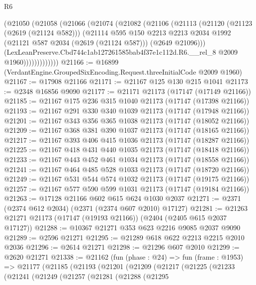 \begin{lexlean}{R6}
\begin{coremodule}
              (@21050
                (@21058
                  (@21066
                    (@21074
                      (@21082
                        (@21106
                          (@21113
                            (@21120
                              (@21123 (@2619 (@21124 @582)))
                              (@21114
                                @595
                                @150
                                @2213
                                @2213
                                @2034
                                @1992
                                (@21121 @587 @2034 (@2619 (@21124 @587)))
                                (@2649 @21096)))
                            (LexLeanPreserve.Cbd744c1ab127261585bab4f37e1c112d.R6.__rel_8
                              @2009
                              @1960)))))))))))))
@21166 := @16899 (VerdantEngine.GroupedSixEncoding.Request.threeInitialCode @2009 @1960)
@21167 := @17908 @21166
@21171 := @21167 @125 @130 @215 @1041
@21173 := @2348 @16856 @9090
@21177 := @21171 @21173 (@17147 (@17149 @21166))
@21185 := @21167 @175 @236 @315 @1040 @21173 (@17147 (@17398 @21166))
@21193 := @21167 @291 @330 @340 @1039 @21173 (@17147 (@17948 @21166))
@21201 := @21167 @343 @356 @365 @1038 @21173 (@17147 (@18052 @21166))
@21209 := @21167 @368 @381 @390 @1037 @21173 (@17147 (@18165 @21166))
@21217 := @21167 @393 @406 @415 @1036 @21173 (@17147 (@18287 @21166))
@21225 := @21167 @418 @431 @440 @1035 @21173 (@17147 (@18418 @21166))
@21233 := @21167 @443 @452 @461 @1034 @21173 (@17147 (@18558 @21166))
@21241 := @21167 @464 @485 @528 @1033 @21173 (@17147 (@18720 @21166))
@21249 := @21167 @531 @544 @574 @1032 @21173 (@17147 (@19175 @21166))
@21257 := @21167 @577 @590 @599 @1031 @21173 (@17147 (@19184 @21166))
@21263 := @17128 @21166 @602 @615 @624 @1030 @2037
@21271 := @2371 (@2374 @612 @2034) (@2371 (@2374 @607 @2010) @17127)
@21281 := @21263 @21271 @21173 (@17147 (@19193 @21166)) (@2404 (@2405 @615 @2037 @17127))
@21288 := @10367 @21271 @353 @623 @2216 @9085 @2037 @9090
@21289 := @2596 @21271
@21295 := @21289 @618 @622 @2213 @2215 @2010 @2036
@21296 := @2614 @21271
@21298 := @21296 @607 @2010
@21299 := @2620 @21271
@21338 := @21162
    (fun (phase : @24) =>
    fun (frame : @1953) =>
    @21177
      (@21185
        (@21193
          (@21201
            (@21209
              (@21217
                (@21225
                  (@21233
                    (@21241
                      (@21249
                        (@21257
                          (@21281
                            (@21288
                              (@21295

\end{coremodule}
\end{lexlean}
